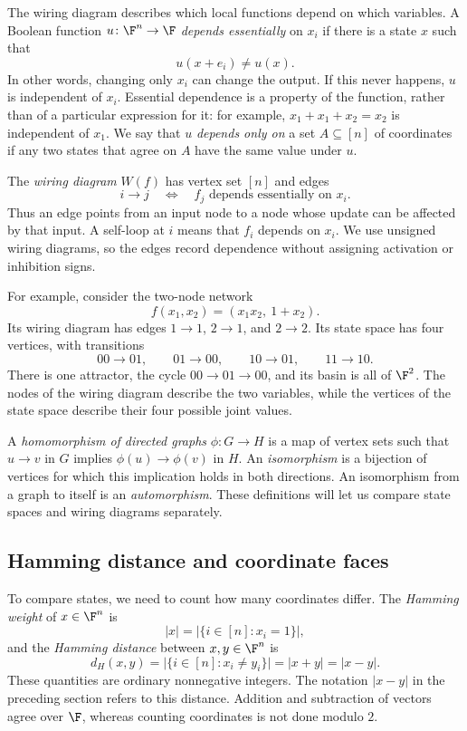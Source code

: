 The wiring diagram describes which local functions depend on which variables. A Boolean function $u\colon\F^n\to\F$ \emph{depends essentially} on $x_i$ if there is a state $x$ such that
\[
    u(x+e_i)\ne u(x).
\]
In other words, changing only $x_i$ can change the output. If this never happens, $u$ is independent of $x_i$. Essential dependence is a property of the function, rather than of a particular expression for it: for example, $x_1+x_1+x_2=x_2$ is independent of $x_1$. We say that $u$ \emph{depends only on} a set $A\subseteq[n]$ of coordinates if any two states that agree on $A$ have the same value under $u$.

The \emph{wiring diagram} $W(f)$ has vertex set $[n]$ and edges
\[
    i\longrightarrow j
    \quad\Longleftrightarrow\quad
    f_j\text{ depends essentially on }x_i.
\]
Thus an edge points from an input node to a node whose update can be affected by that input. A self-loop at $i$ means that $f_i$ depends on $x_i$. We use unsigned wiring diagrams, so the edges record dependence without assigning activation or inhibition signs.

For example, consider the two-node network
\[
    f(x_1,x_2)=(x_1x_2,\ 1+x_2).
\]
Its wiring diagram has edges $1\to1$, $2\to1$, and $2\to2$. Its state space has four vertices, with transitions
\[
    00\longrightarrow01,\qquad
    01\longrightarrow00,\qquad
    10\longrightarrow01,\qquad
    11\longrightarrow10.
\]
There is one attractor, the cycle $00\to01\to00$, and its basin is all of $\F^2$. The nodes of the wiring diagram describe the two variables, while the vertices of the state space describe their four possible joint values.

A \emph{homomorphism of directed graphs} $\phi\colon G\to H$ is a map of vertex sets such that $u\to v$ in $G$ implies $\phi(u)\to\phi(v)$ in $H$. An \emph{isomorphism} is a bijection of vertices for which this implication holds in both directions. An isomorphism from a graph to itself is an \emph{automorphism}. These definitions will let us compare state spaces and wiring diagrams separately.

\subsection{Hamming distance and coordinate faces}

To compare states, we need to count how many coordinates differ. The \emph{Hamming weight} of $x\in\F^n$ is
\[
    |x|=\bigl|\{i\in[n]:x_i=1\}\bigr|,
\]
and the \emph{Hamming distance} between $x,y\in\F^n$ is
\[
    d_H(x,y)=\bigl|\{i\in[n]:x_i\ne y_i\}\bigr|
            =|x+y|=|x-y|.
\]
These quantities are ordinary nonnegative integers. The notation $|x-y|$ in the preceding section refers to this distance. Addition and subtraction of vectors agree over $\F$, whereas counting coordinates is not done modulo $2$.

